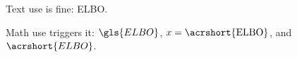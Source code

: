\documentclass{article}
\DeclareMathOperator{\ELBO}{\acrshort{ELBO}}
\begin{document}
Text use is fine: \gls{ELBO}.

Math use triggers it: $\gls{ELBO}$, $x = \ELBO$, and $\acrshort{ELBO}$.
\end{document}
